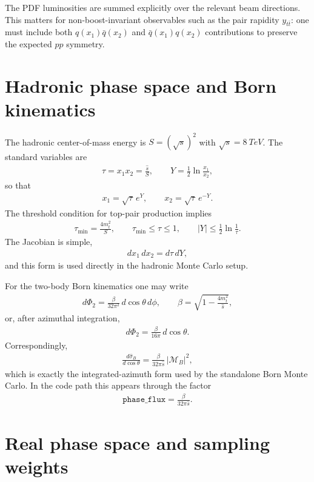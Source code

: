 \documentclass[11pt]{article}
\begin{document}
The PDF luminosities are summed explicitly over the relevant beam directions.
This matters for non-boost-invariant observables such as the pair rapidity $y_{t\bar t}$:
one must include both $q(x_1)\bar q(x_2)$ and $\bar q(x_1)q(x_2)$ contributions to preserve the expected $pp$ symmetry.
\section{Hadronic phase space and Born kinematics}

The hadronic center-of-mass energy is $S=(\sqrt{s})^2$ with $\sqrt{s}=\SI{8}{TeV}$.
The standard variables are
\begin{align}
\tau = x_1 x_2 = \frac{\hat s}{S},
\qquad
Y = \frac{1}{2}\ln\frac{x_1}{x_2},
\end{align}
so that
\begin{align}
x_1 = \sqrt{\tau}\,e^{Y},
\qquad
x_2 = \sqrt{\tau}\,e^{-Y}.
\end{align}
The threshold condition for top-pair production implies
\begin{align}
\tau_{\min} = \frac{4m_t^2}{S},
\qquad
\tau_{\min} \le \tau \le 1,
\qquad
|Y| \le \frac{1}{2}\ln\frac{1}{\tau}.
\end{align}
The Jacobian is simple,
\begin{align}
dx_1\,dx_2 = d\tau\,dY,
\end{align}
and this form is used directly in the hadronic Monte Carlo setup.

For the two-body Born kinematics one may write
\begin{align}
d\Phi_2 = \frac{\beta}{32\pi^2}\,d\cos\theta\,d\phi,
\qquad
\beta = \sqrt{1-\frac{4m_t^2}{\hat s}},
\end{align}
or, after azimuthal integration,
\begin{align}
d\Phi_2 = \frac{\beta}{16\pi}\,d\cos\theta.
\end{align}
Correspondingly,
\begin{align}
\frac{d\hat\sigma_B}{d\cos\theta}
= \frac{\beta}{32\pi\hat s}\,|\mathcal{M}_B|^2,
\end{align}
which is exactly the integrated-azimuth form used by the standalone Born Monte Carlo.
In the code path this appears through the factor
\begin{align}
\texttt{phase\_flux} = \frac{\beta}{32\pi\hat s}.
\end{align}

\section{Real phase space and sampling weights}
\end{document}
